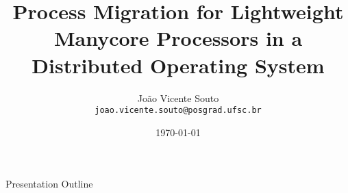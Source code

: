 \documentclass[english]{lapesd-slides}
\title[Process Migration for LW Processors in a Distributed OS]{
	Process Migration for Lightweight Manycore Processors in a Distributed Operating System
}
\author[J. V. Souto]{
	\large João Vicente Souto\\
	{\small \texttt{joao.vicente.souto@posgrad.ufsc.br}}
}
\institute{
	\fontsize{10.5}{12.6}\selectfont 
	Parallel Computing - Computer Science\\
	INE/UFSC, Florianópolis\\
}
\date{\today}
\begin{document}
\titleframe

\begin{frame}{Presentation Outline}
  \tableofcontents
\end{frame}

\showsections









\thanksframe



\end{document}
